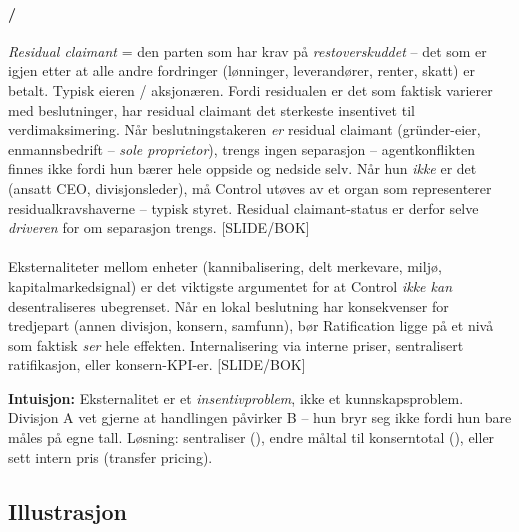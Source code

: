 \paragraph{\quad\SOne/\SThree}
\emph{Residual claimant} = den parten som har krav på \emph{restoverskuddet} -- det som er igjen etter at alle andre fordringer (lønninger, leverandører, renter, skatt) er betalt. Typisk eieren / aksjonæren. Fordi residualen er det som faktisk varierer med beslutninger, har residual claimant det sterkeste insentivet til verdimaksimering. Når beslutningstakeren \emph{er} residual claimant (gründer-eier, enmannsbedrift -- \emph{sole proprietor}), trengs ingen separasjon -- agentkonflikten finnes ikke fordi hun bærer hele oppside og nedside selv. Når hun \emph{ikke} er det (ansatt CEO, divisjonsleder), må Control utøves av et organ som representerer residualkravshaverne -- typisk styret. Residual claimant-status er derfor selve \emph{driveren} for om separasjon trengs. [SLIDE/BOK]

\paragraph{\quad\SOne}
Eksternaliteter mellom enheter (kannibalisering, delt merkevare, miljø, kapitalmarkedsignal) er det viktigste argumentet for at Control \emph{ikke kan} desentraliseres ubegrenset. Når en lokal beslutning har konsekvenser for tredjepart (annen divisjon, konsern, samfunn), bør Ratification ligge på et nivå som faktisk \emph{ser} hele effekten. Internalisering via interne priser, sentralisert ratifikasjon, eller konsern-KPI-er. [SLIDE/BOK]

\begin{tcolorbox}[colback=blue!4, colframe=blue!50!black, boxrule=0.4pt, arc=2pt, left=6pt, right=6pt, top=4pt, bottom=4pt]
\textbf{Intuisjon:} Eksternalitet er et \emph{insentivproblem}, ikke et kunnskapsproblem. Divisjon A vet gjerne at handlingen påvirker B -- hun bryr seg ikke fordi hun bare måles på egne tall. Løsning: sentraliser (\SOne), endre måltal til konserntotal (\STwo), eller sett intern pris (transfer pricing).
\end{tcolorbox}

\subsection*{Illustrasjon}

